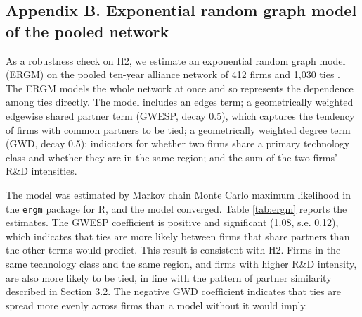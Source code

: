 \documentclass[12pt]{article}
\begin{document}
\clearpage
\subsection*{Appendix B. Exponential random graph model of the pooled network}

As a robustness check on H2, we estimate an exponential random graph model (ERGM) on the pooled ten-year alliance network of 412 firms and 1,030 ties \citep{lusher2013}. The ERGM models the whole network at once and so represents the dependence among ties directly. The model includes an edges term; a geometrically weighted edgewise shared partner term (GWESP, decay 0.5), which captures the tendency of firms with common partners to be tied; a geometrically weighted degree term (GWD, decay 0.5); indicators for whether two firms share a primary technology class and whether they are in the same region; and the sum of the two firms' R\&D intensities.

The model was estimated by Markov chain Monte Carlo maximum likelihood in the \texttt{ergm} package for R, and the model converged. Table \ref{tab:ergm} reports the estimates. The GWESP coefficient is positive and significant (1.08, s.e. 0.12), which indicates that ties are more likely between firms that share partners than the other terms would predict. This result is consistent with H2. Firms in the same technology class and the same region, and firms with higher R\&D intensity, are also more likely to be tied, in line with the pattern of partner similarity described in Section 3.2. The negative GWD coefficient indicates that ties are spread more evenly across firms than a model without it would imply.
\end{document}
